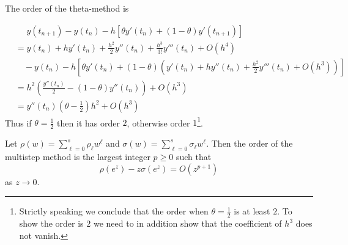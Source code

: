 \documentclass[a4paper]{article}
\begin{document}
The order of the theta-method is

\begin{align*}
  &\phantom{={} } y(t_{n + 1}) - y(t_n) - h[\theta y'(t_n) + (1 - \theta) y'(t_{n + 1})] \\
  &= y(t_n) + hy'(t_n) + \frac{h^2}{2} y''(t_n) + \frac{h^3}{3!}y'''(t_n) + O(h^4) \\
  &\quad - y(t_n) - h[\theta y'(t_n) + (1 - \theta)(y'(t_n) + hy''(t_n) + \frac{h^2}{2} y'''(t_n) + O(h^3))] \\
  &= h^2 \left( \frac{y''(t_n)}{2} - (1 - \theta)y''(t_n) \right) + O(h^3) \\
  &= y''(t_n)(\theta - \frac{1}{2})h^2 + O(h^3)
\end{align*}
Thus if \(\theta = \frac{1}{2}\) then it has order \(2\), otherwise order \(1\)\footnote{Strictly speaking we conclude that the order when \(\theta = \frac{1}{2}\) is at least \(2\). To show the order is \(2\) we need to in addition show that the coefficient of \(h^3\) does not vanish.}.

\begin{theorem}
  Let \(\rho(w) = \sum_{\ell = 0}^s \rho_\ell w^\ell\) and \(\sigma(w) = \sum_{\ell = 0}^s \sigma_\ell w^\ell\). Then the order of the multistep method is the largest integer \(p \geq 0\) such that
  \[
    \rho(e^z) - z \sigma(e^z) = O(z^{p + 1})
  \]
  as \(z \to 0\).
\end{theorem}
\end{document}
